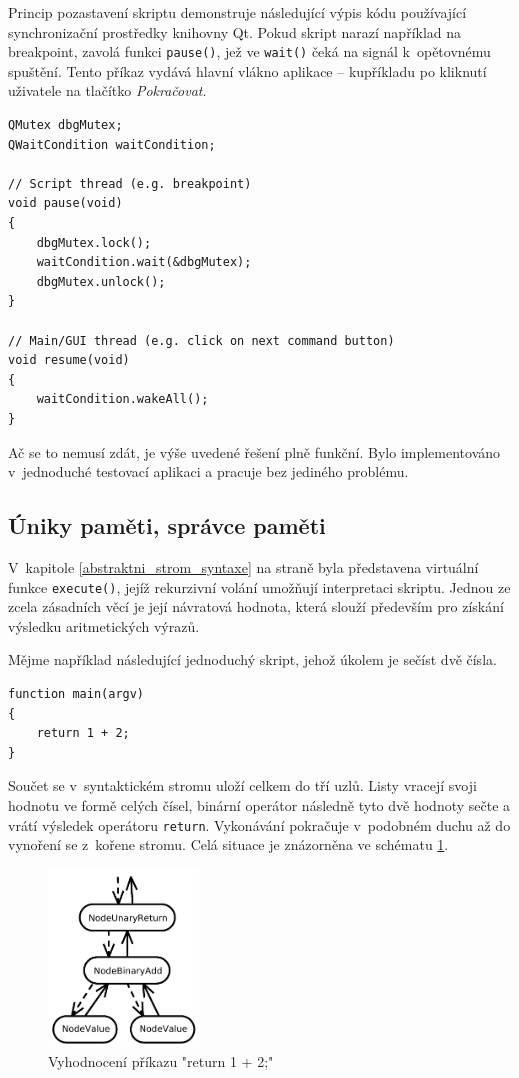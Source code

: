 \documentclass[11pt,twoside,a4paper]{book}
\begin{document}
Princip pozastavení skriptu demonstruje následující výpis kódu používající synchronizační prostředky knihovny Qt. Pokud skript narazí například na breakpoint, zavolá funkci \texttt{pause()}, jež ve \texttt{wait()} čeká na signál k~opětovnému spuštění. Tento příkaz vydává hlavní vlákno aplikace -- kupříkladu po kliknutí uživatele na tlačítko \textit{Pokračovat}.

\begin{verbatim}
QMutex dbgMutex;
QWaitCondition waitCondition;

// Script thread (e.g. breakpoint)
void pause(void)
{
    dbgMutex.lock();
    waitCondition.wait(&dbgMutex);
    dbgMutex.unlock();
}

// Main/GUI thread (e.g. click on next command button)
void resume(void)
{
    waitCondition.wakeAll();
}
\end{verbatim}

Ač se to nemusí zdát, je výše uvedené řešení plně funkční. Bylo implementováno v~jednoduché testovací aplikaci a pracuje bez jediného problému.


\subsection{Úniky paměti, správce paměti}

V~kapitole \ref{abstraktni_strom_syntaxe} na straně \pageref{abstraktni_strom_syntaxe} byla představena virtuální funkce \texttt{execute()}, jejíž rekurzivní volání umožňují interpretaci skriptu. Jednou ze zcela zásadních věcí je její návratová hodnota, která slouží především pro získání výsledku aritmetických výrazů.

Mějme například následující jednoduchý skript, jehož úkolem je sečíst dvě čísla.

\begin{verbatim}
function main(argv)
{
    return 1 + 2;
}
\end{verbatim}

Součet se v~syntaktickém stromu uloží celkem do tří uzlů. Listy vracejí svoji hodnotu ve formě celých čísel, binární operátor následně tyto dvě hodnoty sečte a vrátí výsledek operátoru \texttt{return}. Vykonávání pokračuje v~podobném duchu až do vynoření se z~kořene stromu. Celá situace je znázorněna ve schématu \ref{fig:execute}.

\begin{figure}[ht]
\begin{center}
\includegraphics[width=4cm]{img/execute.pdf}
\caption[Vyhodnocení příkazu]{Vyhodnocení příkazu "return 1 + 2;"}
\label{fig:execute}
\end{center}
\end{figure}
\end{document}
